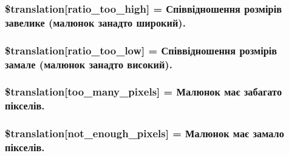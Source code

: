 \subsubsection[{\$translation}]{\setlength{\rightskip}{0pt plus 5cm}\$translation\mbox{[}\textquotesingle{}ratio\+\_\+too\+\_\+high\textquotesingle{}\mbox{]} = \textquotesingle{}Співвідношення розмірів завелике (малюнок занадто широкий).\textquotesingle{}}\label{class_8upload_8uk___u_a_8php_a23396f6ce7f31e5e5f1b57580621d982}
\hypertarget{class_8upload_8uk___u_a_8php_ac533b9a479f056b0b8623e4268f068c2}{}
\subsubsection[{\$translation}]{\setlength{\rightskip}{0pt plus 5cm}\$translation\mbox{[}\textquotesingle{}ratio\+\_\+too\+\_\+low\textquotesingle{}\mbox{]} = \textquotesingle{}Співвідношення розмірів замале (малюнок занадто високий).\textquotesingle{}}\label{class_8upload_8uk___u_a_8php_ac533b9a479f056b0b8623e4268f068c2}
\hypertarget{class_8upload_8uk___u_a_8php_aa4051ef64e94a3f8295c63cf85544016}{}
\subsubsection[{\$translation}]{\setlength{\rightskip}{0pt plus 5cm}\$translation\mbox{[}\textquotesingle{}too\+\_\+many\+\_\+pixels\textquotesingle{}\mbox{]} = \textquotesingle{}Малюнок має забагато пікселів.\textquotesingle{}}\label{class_8upload_8uk___u_a_8php_aa4051ef64e94a3f8295c63cf85544016}
\hypertarget{class_8upload_8uk___u_a_8php_a1fe342c27ce61f4ff4e0120ba647033e}{}
\subsubsection[{\$translation}]{\setlength{\rightskip}{0pt plus 5cm}\$translation\mbox{[}\textquotesingle{}not\+\_\+enough\+\_\+pixels\textquotesingle{}\mbox{]} = \textquotesingle{}Малюнок має замало пікселів.\textquotesingle{}}\label{class_8upload_8uk___u_a_8php_a1fe342c27ce61f4ff4e0120ba647033e}
\hypertarget{class_8upload_8uk___u_a_8php_a4ce76e7be0b3a03c2b47f6d70c21832e}{}
